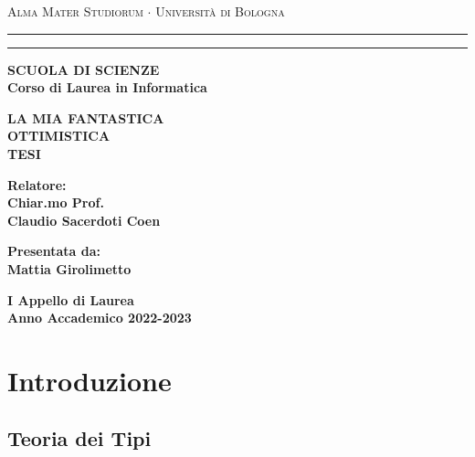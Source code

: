 \documentclass[12pt,a4paper]{report}
\begin{document}
\begin{titlepage}
  \begin{center}
    {{
      \Large{\textsc{Alma Mater Studiorum $\cdot$ Universit\`a di Bologna}}
    }} \rule[0.1cm]{15.8cm}{0.1mm}
    \rule[0.5cm]{15.8cm}{0.6mm}
    {\small{\bf SCUOLA DI SCIENZE\\
    Corso di Laurea in Informatica}}
  \end{center}
  \vspace{15mm}
  \begin{center}
    {\LARGE{\bf LA MIA FANTASTICA}}\\
    \vspace{3mm}
    {\LARGE{\bf OTTIMISTICA}}\\
    \vspace{3mm}
    {\LARGE{\bf TESI}}\\
  \end{center}
  \vspace{40mm}
  \par
  \noindent
  \begin{minipage}[t]{0.47\textwidth}
  {\large{\bf Relatore:\\
  Chiar.mo Prof.\\ %
  Claudio Sacerdoti Coen}}
  \end{minipage}
  \hfill
  \begin{minipage}[t]{0.47\textwidth}\raggedleft
  {\large{\bf Presentata da:\\
  Mattia Girolimetto}}
  \end{minipage}
  \vspace{20mm}
  \begin{center}
  {\large{\bf I Appello di Laurea\\%
  Anno Accademico 2022-2023}}%
  \end{center}
\end{titlepage}


\tableofcontents

\chapter{Introduzione}

\section{Teoria dei Tipi}
\end{document}
